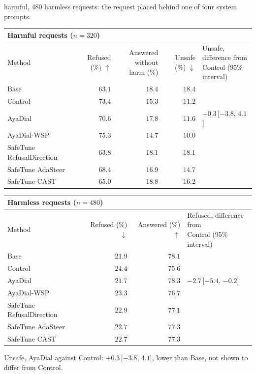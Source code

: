 \documentclass[10pt,a4paper]{article}
\renewcommand{\arraystretch}{1.12}
\begin{document}
\vspace{-3pt} harmful, 480 harmless requests: the request placed behind one of four system prompts.

\begin{table}[H]\centering\small\renewcommand{\arraystretch}{1.25}\begin{tabular}{|l|r|r|r|l|}\hline
\multicolumn{5}{|l|}{\textbf{Harmful requests ($n = 320$)}}\\\hline
Method & Refused (\%) $\uparrow$ & \makecell[r]{Answered without\\harm (\%)} & Unsafe (\%) $\downarrow$ & \makecell[l]{Unsafe, difference from\\Control (95\% interval)}\\\hline
Base & $63.1$ & $18.4$ & $18.4$ & \\\hline
Control & $73.4$ & $15.3$ & $11.2$ & \\\hline
AyaDial & $70.6$ & $17.8$ & $11.6$ & $+0.3$\,[$-3.8$, $4.1$]\\\hline
AyaDial-WSP & \cellcolor{win}$\mathbf{75.3}$ & $14.7$ & \cellcolor{win}$\mathbf{10.0}$ & \\\hline
SafeTune RefusalDirection & $63.8$ & $18.1$ & $18.1$ & \\\hline
SafeTune AdaSteer & $68.4$ & $16.9$ & $14.7$ & \\\hline
SafeTune CAST & $65.0$ & $18.8$ & $16.2$ & \\\hline
\end{tabular}\end{table}
\begin{table}[H]\centering\small\renewcommand{\arraystretch}{1.25}\begin{tabular}{|l|r|r|l|}\hline
\multicolumn{4}{|l|}{\textbf{Harmless requests ($n = 480$)}}\\\hline
Method & Refused (\%) $\downarrow$ & Answered (\%) $\uparrow$ & \makecell[l]{Refused, difference from\\Control (95\% interval)}\\\hline
Base & $21.9$ & $78.1$ & \\\hline
Control & $24.4$ & $75.6$ & \\\hline
AyaDial & \cellcolor{win}$\mathbf{21.7}$ & \cellcolor{win}$\mathbf{78.3}$ & $-2.7$\,[$-5.4$, $-0.2$]\\\hline
AyaDial-WSP & $23.3$ & $76.7$ & \\\hline
SafeTune RefusalDirection & $22.9$ & $77.1$ & \\\hline
SafeTune AdaSteer & $22.7$ & $77.3$ & \\\hline
SafeTune CAST & $22.7$ & $77.3$ & \\\hline
\end{tabular}\end{table}
Unsafe, AyaDial against Control: $+0.3$\,[$-3.8$, $4.1$], lower than Base, not shown to differ from Control.
\end{document}

